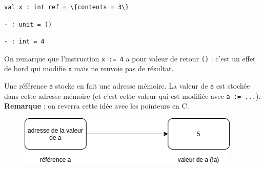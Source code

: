 \documentclass[11pt]{article}
\makeatletter
\newcommand{\boxspacing}{\kern\kvtcb@left@rule\kern\kvtcb@boxsep}
\newcommand{\prompt}[4]{
        {\ttfamily\llap{{\color{#2}[#3]:\hspace{3pt}#4}}\vspace{-\baselineskip}}
    }
\makeatother
\begin{document}
            \begin{tcolorbox}[breakable, size=fbox, boxrule=.5pt, pad at break*=1mm, opacityfill=0]
\prompt{Out}{outcolor}{34}{\boxspacing}
\begin{Verbatim}[commandchars=\\\{\}]
val x : int ref = \{contents = 3\}

\end{Verbatim}
\end{tcolorbox}
        
            \begin{tcolorbox}[breakable, size=fbox, boxrule=.5pt, pad at break*=1mm, opacityfill=0]
\prompt{Out}{outcolor}{34}{\boxspacing}
\begin{Verbatim}[commandchars=\\\{\}]
- : unit = ()

\end{Verbatim}
\end{tcolorbox}
        
            \begin{tcolorbox}[breakable, size=fbox, boxrule=.5pt, pad at break*=1mm, opacityfill=0]
\prompt{Out}{outcolor}{34}{\boxspacing}
\begin{Verbatim}[commandchars=\\\{\}]
- : int = 4

\end{Verbatim}
\end{tcolorbox}
        
    On remarque que l'instruction \texttt{x\ :=\ 4} a pour valeur de retour
\texttt{()} : c'est un effet de bord qui modifie \texttt{x} mais ne
renvoie pas de résultat.

    Une référence \texttt{a} stocke en fait une adresse mémoire. La valeur
de \texttt{a} est stockée dans cette adresse mémoire (et c'est cette
valeur qui est modifiée avec \texttt{a\ :=\ ...}).\\
\textbf{Remarque} : on reverra cette idée avec les pointeurs en C.

\begin{figure} 
\centering 
\includegraphics[width=300pt]{img/ref.drawio.png} 
\end{figure}
\end{document}
